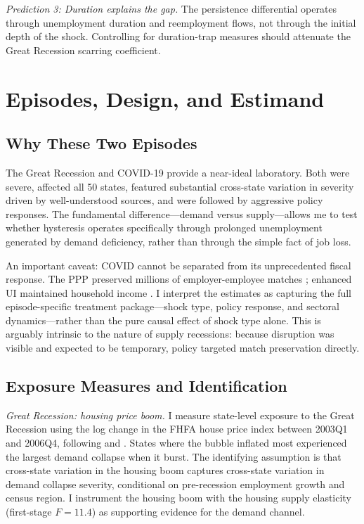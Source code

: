 \documentclass[12pt]{article}
\begin{document}
\textit{Prediction 3: Duration explains the gap.} The persistence differential operates through unemployment duration and reemployment flows, not through the initial depth of the shock. Controlling for duration-trap measures should attenuate the Great Recession scarring coefficient.


\section{Episodes, Design, and Estimand}
\label{sec:design}

\subsection{Why These Two Episodes}

The Great Recession and COVID-19 provide a near-ideal laboratory. Both were severe, affected all 50 states, featured substantial cross-state variation in severity driven by well-understood sources, and were followed by aggressive policy responses. The fundamental difference---demand versus supply---allows me to test whether hysteresis operates specifically through prolonged unemployment generated by demand deficiency, rather than through the simple fact of job loss.

An important caveat: COVID cannot be separated from its unprecedented fiscal response. The PPP preserved millions of employer-employee matches \citep{autor2022paycheck}; enhanced UI maintained household income \citep{ganong2020us}. I interpret the estimates as capturing the full episode-specific treatment package---shock type, policy response, and sectoral dynamics---rather than the pure causal effect of shock type alone. This is arguably intrinsic to the nature of supply recessions: because disruption was visible and expected to be temporary, policy targeted match preservation directly.

\subsection{Exposure Measures and Identification}

\textit{Great Recession: housing price boom.} I measure state-level exposure to the Great Recession using the log change in the FHFA house price index between 2003Q1 and 2006Q4, following \citet{mian2014explains} and \citet{charles2016masking}. States where the bubble inflated most experienced the largest demand collapse when it burst. The identifying assumption is that cross-state variation in the housing boom captures cross-state variation in demand collapse severity, conditional on pre-recession employment growth and census region. I instrument the housing boom with the \citet{saiz2010geographic} housing supply elasticity (first-stage $F = 11.4$) as supporting evidence for the demand channel.
\end{document}
